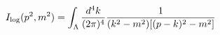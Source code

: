 \begin{equation}
I_{\log }(p^{2},m^{2})=\int_{\Lambda }\frac{d^{4}k}{(2\pi )^{4}}\frac{1}{%
(k^{2}-m^{2})[(p-k)^{2}-m^{2}]}
\end{equation}

